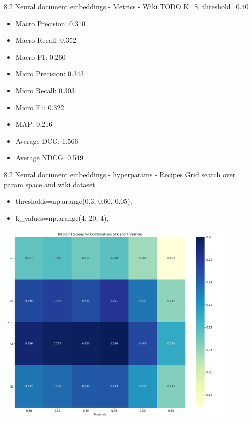 \documentclass{beamer}
\begin{document}
\begin{frame}{8.2 Neural document embeddings - Metrics - Wiki}
  TODO
  K=8, threshold=0.40
  \begin{itemize}
    \item Macro Precision: 0.310
    \item Macro Recall: 0.352
    \item Macro F1: 0.260
    \item Micro Precision: 0.343
    \item Micro Recall: 0.303
    \item Micro F1: 0.322
    \item MAP: 0.216
    \item Average DCG: 1.566
    \item Average NDCG: 0.549
  \end{itemize}
\end{frame}

\begin{frame}{8.2 Neural document embeddings - hyperparams - Recipes}
  Grid search over param space and wiki dataset
  \begin{itemize}
    \item thresholds=np.arange(0.3, 0.60, 0.05),
    \item k\_values=np.arange(4, 20, 4),
  \end{itemize}
\end{frame}

\begin{frame}
  \centering
  \includegraphics[width=0.9\textwidth]{heatmap_embedding_recipe.png}
\end{frame}
\end{document}
